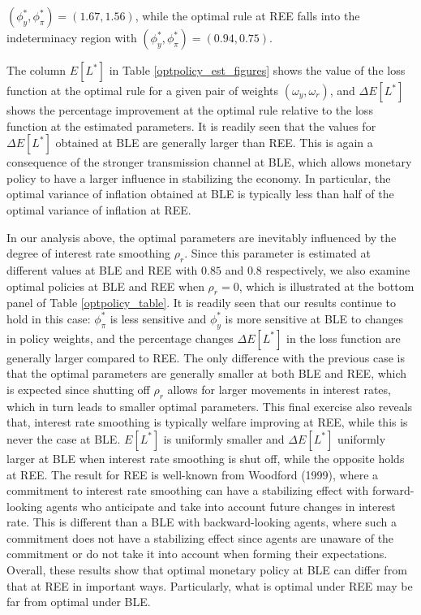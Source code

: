 $(\phi_y^{*},\phi_{\pi}^{*})=(1.67,1.56)$, while the optimal rule at REE falls into the indeterminacy region with $(\phi_y^{*},\phi_{\pi}^{*})=(0.94,0.75)$.

The column $E[L^{*}]$ in Table \ref{optpolicy_est_figures} shows the value of the loss function at the optimal rule for a given pair of weights $(\omega_y,\omega_r)$, and $\Delta E[L^{*}]$ shows the percentage improvement at the optimal rule relative to the loss function at the estimated parameters. It is readily seen that the values for $\Delta E[L^{*}]$ obtained at BLE are generally larger than REE. This is again a consequence of the stronger transmission channel at BLE, which allows monetary policy to have a larger influence in stabilizing the economy. In particular, the optimal variance of inflation obtained at BLE is typically less than half of the optimal variance of inflation at REE. 

In our analysis above, the optimal parameters are inevitably influenced by the degree of interest rate smoothing $\rho_r$. Since this parameter is estimated at different values at BLE and REE with $0.85$ and $0.8$ respectively, we also examine optimal policies at BLE and REE when $\rho_r=0$, which is illustrated at the bottom panel of Table \ref{optpolicy_table}. It is readily seen that our results continue to hold in this case: $\phi_{\pi}^{*}$ is less sensitive and $\phi_y^{*}$ is more sensitive at BLE to changes in policy weights, and the percentage changes $\Delta E[L^{*}]$ in the loss function are generally larger compared to REE. The only difference with the previous case is that the optimal parameters are generally smaller at both BLE and REE, which is expected since shutting off $\rho_r$ allows for larger movements in interest rates, which in turn leads to smaller optimal parameters. This final exercise also reveals that, interest rate smoothing is typically welfare improving at REE, while this is never the case at BLE. $E[L^{*}]$ is uniformly smaller and $ \Delta E[L^{*}]$ uniformly larger at BLE when interest rate smoothing is shut off, while the opposite holds at REE. The result for REE is well-known from Woodford (1999), where a commitment to interest rate smoothing can have a stabilizing effect with forward-looking agents who anticipate and take into account future changes in interest rate. This is different than a BLE with backward-looking agents, where such a commitment does not have a stabilizing effect since agents are unaware of the commitment or do not take it into account when forming their expectations. Overall, these results show that optimal monetary policy at BLE can differ from that at REE in important ways. Particularly, what is optimal under REE may be far from optimal under BLE.




